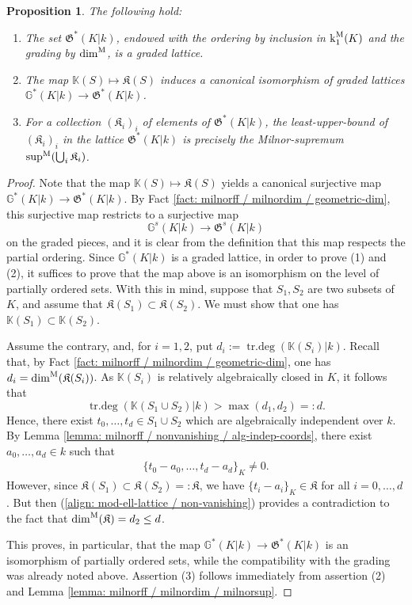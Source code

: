 \documentclass[11pt]{amsart}
\newtheorem{proposition}{Proposition}[section]
\theoremstyle{definition}
\theoremstyle{remark}
\numberwithin{equation}{section}
\DeclareMathOperator{\trdeg}{tr.deg}
\newcommand{\G}{\mathbb{G}}
\newcommand{\Gbb}{\mathbb{G}}
\newcommand{\Kbb}{\mathbb{K}}
\newcommand{\Kfrak}{\mathfrak{K}}
\newcommand{\Gfrak}{\mathfrak{G}}
\renewcommand{\k}{\operatorname{k}^{\rm M}}
\newcommand{\dimm}{\dim^{\rm M}}
\newcommand{\msup}{{\sup}^{\rm M}}
\begin{document}
\begin{proposition}
\label{proposition: lattice / mod-ell / mod-ell-lattice}
  The following hold:
  \begin{enumerate}
    \item The set $\Gfrak^*(K|k)$, endowed with the ordering by inclusion in $\k_1(K)$ and the grading by $\dimm$, is a graded lattice.
    \item The map $\Kbb(S) \mapsto \Kfrak(S)$ induces a canonical isomorphism of graded lattices $\G^*(K|k) \rightarrow \Gfrak^*(K|k)$.
    \item For a collection $(\Kfrak_i)_i$ of elements of $\Gfrak^*(K|k)$, the least-upper-bound of $(\Kfrak_i)_i$ in the lattice $\Gfrak^*(K|k)$ is precisely the Milnor-supremum $\msup(\bigcup_i \Kfrak_i)$.
  \end{enumerate}
\end{proposition}
\begin{proof}
  Note that the map $\Kbb(S) \mapsto \Kfrak(S)$ yields a canonical surjective map $\Gbb^*(K|k) \rightarrow \Gfrak^*(K|k)$.
  By Fact \ref{fact: milnorff / milnordim / geometric-dim}, this surjective map restricts to a surjective map 
  \[ \G^s(K|k) \rightarrow \Gfrak^s(K|k) \]
  on the graded pieces, and it is clear from the definition that this map respects the partial ordering.
  Since $\G^*(K|k)$ is a graded lattice, in order to prove (1) and (2), it suffices to prove that the map above is an isomorphism on the level of partially ordered sets. 
  With this in mind, suppose that $S_1,S_2$ are two subsets of $K$, and assume that $\Kfrak(S_1) \subset \Kfrak(S_2)$.
  We must show that one has $\Kbb(S_1) \subset \Kbb(S_2)$.

  Assume the contrary, and, for $i = 1,2$, put $d_i := \trdeg(\Kbb(S_i)|k)$.
  Recall that, by Fact \ref{fact: milnorff / milnordim / geometric-dim}, one has $d_i = \dimm(\Kfrak(S_i))$.
  As $\Kbb(S_i)$ is relatively algebraically closed in $K$, it follows that
  \[ \trdeg(\Kbb(S_1 \cup S_2)|k) > \max(d_1,d_2) =: d. \]
  Hence, there exist $t_0,\ldots,t_{d} \in S_1 \cup S_2$ which are algebraically independent over $k$.
  By Lemma \ref{lemma: milnorff / nonvanishing / alg-indep-coords}, there exist $a_0,\ldots,a_d \in k$ such that 
  \begin{align}
  \label{align: mod-ell-lattice / non-vanishing}
    \{t_0-a_0,\ldots,t_d-a_d\}_K \neq 0.
  \end{align}
  However, since $\Kfrak(S_1) \subset \Kfrak(S_2) =: \Kfrak$, we have $\{t_i-a_i\}_K \in \Kfrak$ for all $i = 0,\ldots,d$.
  But then (\ref{align: mod-ell-lattice / non-vanishing}) provides a contradiction to the fact that $\dimm(\Kfrak) = d_2 \leq d$.
  
  This proves, in particular, that the map $\Gbb^*(K|k) \rightarrow \Gfrak^*(K|k)$ is an isomorphism of partially ordered sets, while the compatibility with the grading was already noted above. 
  Assertion (3) follows immediately from assertion (2) and Lemma \ref{lemma: milnorff / milnordim / milnorsup}.
\end{proof}
\end{document}
